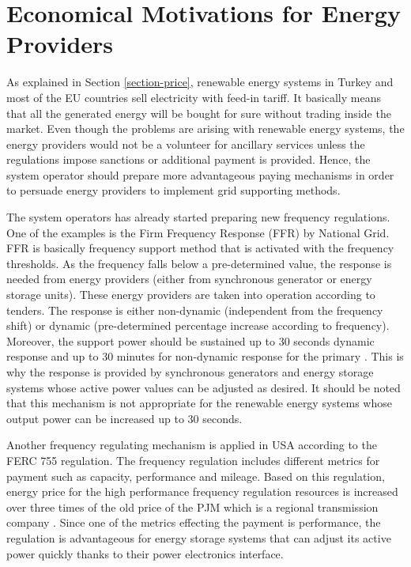 \section{Economical Motivations for Energy Providers}
As explained in Section \ref{section-price}, renewable energy systems in Turkey and most of the EU countries sell electricity with feed-in tariff. It basically means that all the generated energy will be bought for sure without trading inside the market. Even though the problems are arising with renewable energy systems, the energy providers would not be a volunteer for ancillary services unless the regulations impose sanctions or additional payment is provided. Hence, the system operator should prepare more advantageous paying mechanisms in order to persuade energy providers to implement grid supporting methods. \par
The system operators has already started preparing new frequency regulations. One of the examples is the Firm Frequency Response (FFR) by National Grid. FFR is basically frequency support method that is activated with the frequency thresholds. As the frequency falls below a pre-determined value, the response is needed from energy providers (either from synchronous generator or energy storage units). These energy providers are taken into operation according to tenders. The response is either non-dynamic (independent from the frequency shift) or dynamic (pre-determined percentage increase according to frequency). Moreover, the support power should be sustained up to 30 seconds dynamic response and up to 30 minutes for non-dynamic response for the primary \cite{Smethurst2017}. This is why the response is provided by synchronous generators and energy storage systems whose active power values can be adjusted as desired. It should be noted that this mechanism is not appropriate for the renewable energy systems whose output power can be increased up to 30 seconds.\par
Another frequency regulating mechanism is applied in USA according to the FERC 755 regulation. The frequency regulation includes different metrics for payment such as capacity, performance and mileage. Based on this regulation, energy price for the high performance frequency regulation resources is increased over three times of the old price of the PJM which is a regional transmission company \cite{NECEnergySolutions2014}. Since one of the metrics effecting the payment is performance, the regulation is advantageous for energy storage systems that can adjust its active power quickly thanks to their power electronics interface.\par
